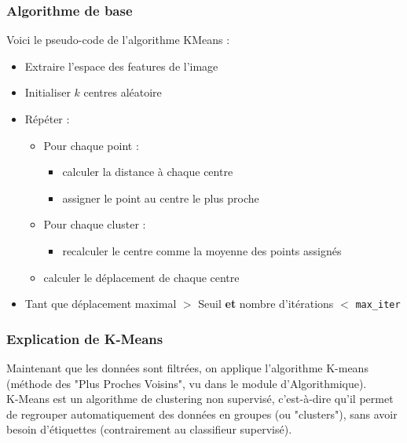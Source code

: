 \documentclass[a4paper]{article}
\begin{document}
            \subsubsection*{Algorithme de base}
            Voici le pseudo-code de l'algorithme KMeans :
            
            \begin{itemize}
                \item Extraire l'espace des features de l'image
                \item Initialiser $k$ centres aléatoire
                \item Répéter :
                \begin{itemize}
                    \item Pour chaque point :
                    \begin{itemize}
                        \item calculer la distance à chaque centre
                        \item assigner le point au centre le plus proche
                    \end{itemize}
                    \item Pour chaque cluster :
                    \begin{itemize}
                        \item recalculer le centre comme la moyenne des points assignés
                    \end{itemize}
                    \item calculer le déplacement de chaque centre
                \end{itemize}
                \item Tant que déplacement maximal $>$ Seuil \textbf{et} nombre d’itérations $<$ \texttt{max\_iter}
            \end{itemize}

                
           
            \subsubsection*{Explication de K-Means}
                Maintenant que les données sont filtrées, on applique l'algorithme K-means (méthode des "Plus Proches Voisins", vu dans le module d'Algorithmique).\\
    
                K-Means est un algorithme de clustering non supervisé, c'est-à-dire qu'il permet de regrouper automatiquement des données en groupes (ou "clusters"), sans avoir besoin d'étiquettes (contrairement au classifieur supervisé).
                
\end{document}
